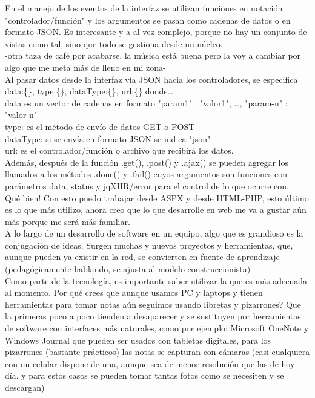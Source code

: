 \documentclass[12pt,spanish,lettersize]{book}
\begin{document}
En el manejo de los eventos de la interfaz se utilizan funciones en notaci\'on "controlador/funci\'on" y los argumentos se pasan como cadenas de datos o en formato JSON. Es interesante y a al vez complejo, porque no hay un conjunto de vistas como tal, sino que todo se gestiona desde un n\'ucleo.\\ 

-otra taza de caf\'e por acabarse, la m\'usica est\'a buena pero la voy a cambiar por algo que me meta m\'as de lleno en mi zona- \\

Al pasar datos desde la interfaz v\'ia JSON hacia los controladores, se especifica data:\{\}, type:\{\}, dataType:\{\}, url:\{\} donde\dots \\

data es un vector de cadenas en formato "param1" : "valor1", \dots , "param-n" : "valor-n" \\

type: es el m\'etodo de env\'io de datos GET o POST \\

dataType: si se env\'ia en formato JSON se indica "json" \\

url: es el controlador/funci\'on o archivo que recibir\'a los datos. \\

Adem\'as, despu\'es de la funci\'on .get(), .post() y .ajax() se pueden agregar los llamados a los m\'etodos .done() y .fail() cuyos argumentos son funciones con par\'ametros data, status y jqXHR/error para el control de lo que ocurre con. \\

Qu\'e bien! Con esto puedo trabajar desde ASPX y desde HTML-PHP, esto \'ultimo es lo que m\'as utilizo, ahora creo que lo que desarrolle en web me va a gustar a\'un m\'as porque me ser\'a m\'as familiar.\\

A lo largo de un desarrollo de software en un equipo, algo que es grandioso es la conjugaci\'on de ideas. Surgen muchas y nuevos proyectos y herramientas, que, aunque pueden ya existir en la red, se convierten en fuente de aprendizaje (pedag\'ogicamente hablando, se ajusta al modelo construccionista)\\

Como parte de la tecnolog\'ia, es importante saber utilizar la que es m\'as adecuada al momento. Por qu\'e crees que aunque usamos PC y laptops y tienen herramientas para tomar notas a\'un seguimos usando libretas y pizarrones? Que la primeras poco a poco tienden a desaparecer y se sustituyen por herramientas de software con interfaces m\'as naturales, como por ejemplo: Microsoft OneNote y Windows Journal que pueden ser usados con tabletas digitales, para los pizarrones (bastante pr\'acticos) las notas se capturan con c\'amaras (casi cualquiera con un celular dispone de una, aunque sea de menor resoluci\'on que las de hoy d\'ia, y para estos casos se pueden tomar tantas fotos como se necesiten y se descargan)\\
\end{document}
